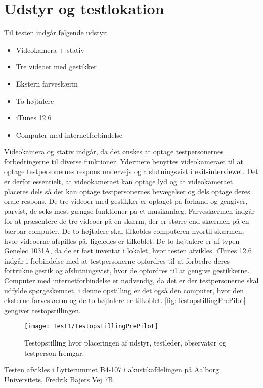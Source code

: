 \section{Udstyr og testlokation}
\label{UdstyrOgTestlokationValgAfGestikker}
%
Til testen indgår følgende udstyr:
%
\begin{itemize}
  \item Videokamera + stativ
  \item Tre videoer med gestikker
  \item Ekstern farveskærm 
  \item To højtalere
  \item iTunes 12.6  
  \item Computer med internetforbindelse\blankline
\end{itemize}
% 
Videokamera og stativ indgår, da det ønskes at optage testpersonernes forbedringerne til diverse funktioner. Ydermere benyttes videokameraet til at optage testpersonernes respons undervejs og afslutningsvist i exit-interviewet. Det er derfor essentielt, at videokameraet kan optage lyd og at videokameraet placeres dels så det kan optage testpersonernes bevægelser og dels optage deres orale respons. De tre videoer med gestikker er optaget på forhånd og gengiver, parvist, de seks mest gængse funktioner på et musikanlæg. Farveskærmen indgår for at præsentere de tre videoer på en skærm, der er større end skærmen på en bærbar computer. De to højtalere skal tilkobles computeren hvortil skærmen, hvor videoerne afspilles på, ligeledes er tilkoblet. De to højtalere er af typen Genelec 1031A, da de er fast inventar i lokalet, hvor testen afvikles. iTunes 12.6 indgår i forbindelse med at testpersonerne opfordres til at forbedre deres fortrukne gestik og afslutningsvist, hvor de opfordres til at gengive gestikkerne. Computer med internetforbindelse er nødvendig, da det er der testpersonerne skal udfylde spørgeskemaet, i denne opstilling er det også den computer, hvor den eksterne farveskærm og de to højtalere er tilkoblet. \autoref{fig:TestopstillingPrePilot} gengiver testopstillingen.  
%
\begin{figure}[H]
	\centering
	\texttt{[image: Test1/TestopstillingPrePilot]}
	\caption{Testopstilling hvor placeringen af udstyr, testleder, observatør og testperson fremgår.}
	\label{fig:TestopstillingPrePilot}
\end{figure}
\noindent
% 
Testen afvikles i Lytterummet B4-107 i akustikafdelingen på Aalborg Universitets, Fredrik Bajers Vej 7B. 
%